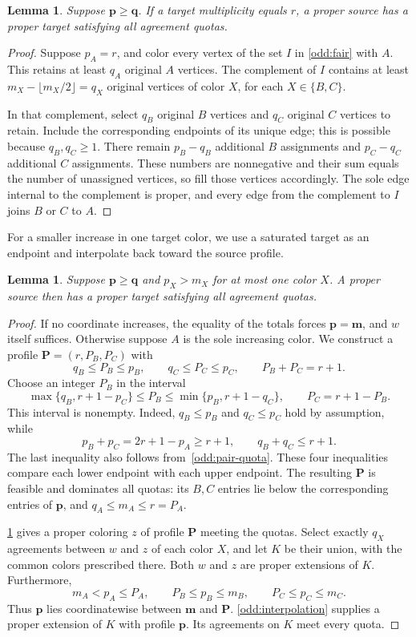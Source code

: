 \documentclass[10pt,a4paper]{amsart}
\numberwithin{equation}{section}
\newtheorem{lemma}[theorem]{Lemma}
\theoremstyle{definition}
\theoremstyle{remark}
\begin{document}
\begin{lemma}\label{odd:saturated}
Suppose $\mathbf p\ge\mathbf q$. If a target multiplicity equals $r$,
a proper source has a proper
target satisfying all agreement quotas.
\end{lemma}
\begin{proof}
Suppose $p_A=r$, and color every vertex of the set $I$ in
\cref{odd:fair} with $A$. This retains at least $q_A$ original
$A$ vertices. The complement of $I$ contains at least
$m_X-\lfloor m_X/2\rfloor=q_X$ original vertices of color $X$,
for each $X\in\{B,C\}$.

In that complement, select $q_B$ original $B$ vertices and $q_C$
original $C$ vertices to retain. Include the corresponding endpoints
of its unique edge; this is possible because $q_B,q_C\ge1$.
There remain $p_B-q_B$ additional $B$ assignments and $p_C-q_C$
additional $C$ assignments. These numbers are nonnegative and their
sum equals the number of unassigned vertices, so fill those vertices
accordingly. The sole edge internal to the complement is proper, and
every edge from the complement to $I$ joins $B$ or $C$ to $A$.
\end{proof}

For a smaller increase in one target color, we use a saturated target
as an endpoint and interpolate back toward the source profile.

\begin{lemma}\label{odd:oneincrease}
Suppose $\mathbf p\ge\mathbf q$ and $p_X>m_X$ for at most one color $X$.
A proper source then
has a proper target satisfying all agreement quotas.
\end{lemma}
\begin{proof}
If no coordinate increases, the equality of the totals forces
$\mathbf p=\mathbf m$, and $w$ itself suffices. Otherwise suppose
$A$ is the sole increasing color. We construct a profile
$\mathbf P=(r,P_B,P_C)$ with
\[
q_B\le P_B\le p_B,\qquad
q_C\le P_C\le p_C,\qquad P_B+P_C=r+1.
\]
Choose an integer $P_B$ in the interval
\[
\max\{q_B,r+1-p_C\}
\le P_B\le
\min\{p_B,r+1-q_C\},
\qquad P_C=r+1-P_B.
\]
This interval is nonempty. Indeed, $q_B\le p_B$ and $q_C\le p_C$
hold by assumption, while
\[
p_B+p_C=2r+1-p_A\ge r+1,
\qquad q_B+q_C\le r+1.
\]
The last inequality also follows from~\eqref{odd:pair-quota}.
These four inequalities compare each lower endpoint with
each upper endpoint. The resulting $\mathbf P$ is feasible and
dominates all quotas: its $B,C$ entries lie below the corresponding
entries of $\mathbf p$, and $q_A\le m_A\le r=P_A$.

\cref{odd:saturated} gives a proper coloring $z$ of profile
$\mathbf P$ meeting the quotas. Select exactly $q_X$ agreements
between $w$ and $z$ of each color $X$, and let $K$ be their union,
with the common colors prescribed there. Both $w$ and $z$ are proper
extensions of $K$. Furthermore,
\[
m_A<p_A\le P_A,
\qquad P_B\le p_B\le m_B,
\qquad P_C\le p_C\le m_C.
\]
Thus $\mathbf p$ lies coordinatewise between $\mathbf m$ and
$\mathbf P$. \cref{odd:interpolation} supplies a proper
extension of $K$ with profile $\mathbf p$. Its agreements on $K$
meet every quota.
\end{proof}
\end{document}
